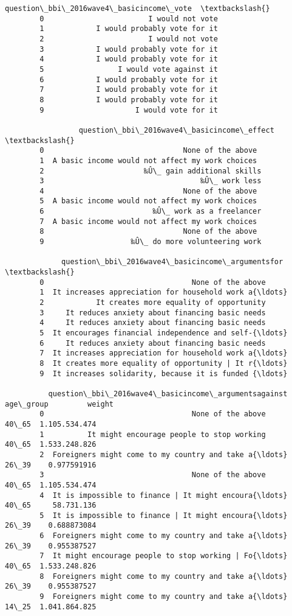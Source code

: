\documentclass[11pt]{article}
\begin{document}
\begin{Verbatim}[commandchars=\\\{\}]
          question\_bbi\_2016wave4\_basicincome\_vote  \textbackslash{}
        0                        I would not vote   
        1            I would probably vote for it   
        2                        I would not vote   
        3            I would probably vote for it   
        4            I would probably vote for it   
        5                 I would vote against it   
        6            I would probably vote for it   
        7            I would probably vote for it   
        8            I would probably vote for it   
        9                     I would vote for it   
        
                 question\_bbi\_2016wave4\_basicincome\_effect  \textbackslash{}
        0                                None of the above   
        1  A basic income would not affect my work choices   
        2                       ‰Û\_ gain additional skills   
        3                                    ‰Û\_ work less   
        4                                None of the above   
        5  A basic income would not affect my work choices   
        6                         ‰Û\_ work as a freelancer   
        7  A basic income would not affect my work choices   
        8                                None of the above   
        9                    ‰Û\_ do more volunteering work   
        
             question\_bbi\_2016wave4\_basicincome\_argumentsfor  \textbackslash{}
        0                                  None of the above   
        1  It increases appreciation for household work a{\ldots}   
        2            It creates more equality of opportunity   
        3     It reduces anxiety about financing basic needs   
        4     It reduces anxiety about financing basic needs   
        5  It encourages financial independence and self-{\ldots}   
        6     It reduces anxiety about financing basic needs   
        7  It increases appreciation for household work a{\ldots}   
        8  It creates more equality of opportunity | It r{\ldots}   
        9  It increases solidarity, because it is funded {\ldots}   
        
          question\_bbi\_2016wave4\_basicincome\_argumentsagainst age\_group         weight  
        0                                  None of the above      40\_65  1.105.534.474  
        1          It might encourage people to stop working      40\_65  1.533.248.826  
        2  Foreigners might come to my country and take a{\ldots}      26\_39    0.977591916  
        3                                  None of the above      40\_65  1.105.534.474  
        4  It is impossible to finance | It might encoura{\ldots}      40\_65     58.731.136  
        5  It is impossible to finance | It might encoura{\ldots}      26\_39    0.688873084  
        6  Foreigners might come to my country and take a{\ldots}      26\_39    0.955387527  
        7  It might encourage people to stop working | Fo{\ldots}      40\_65  1.533.248.826  
        8  Foreigners might come to my country and take a{\ldots}      26\_39    0.955387527  
        9  Foreigners might come to my country and take a{\ldots}      14\_25  1.041.864.825  
\end{Verbatim}
            
\end{document}
